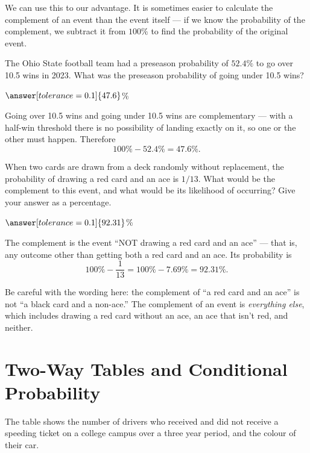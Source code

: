 \documentclass[12pt]{ximera}
\begin{document}
We can use this to our advantage. It is sometimes easier to calculate the complement of
an event than the event itself --- if we know the probability of the complement, we
subtract it from $100\%$ to find the probability of the original event.

\begin{problem}
The Ohio State football team had a preseason probability of $52.4\%$ to go over 10.5 wins
in 2023. What was the preseason probability of going under 10.5 wins?

$\answer[tolerance=0.1]{47.6}$\%

\begin{solution}
Going over 10.5 wins and going under 10.5 wins are complementary --- with a half-win
threshold there is no possibility of landing exactly on it, so one or the other must
happen. Therefore
\[
100\% - 52.4\% = 47.6\%.
\]
\end{solution}
\end{problem}

\begin{problem}
When two cards are drawn from a deck randomly without replacement, the probability of
drawing a red card and an ace is $1/13$. What would be the complement to this event, and
what would be its likelihood of occurring? Give your answer as a percentage.

$\answer[tolerance=0.1]{92.31}$\%

\begin{freeResponse}
\end{freeResponse}

\begin{solution}
The complement is the event ``NOT drawing a red card and an ace'' --- that is, any
outcome other than getting both a red card and an ace. Its probability is
\[
100\% - \frac{1}{13} = 100\% - 7.69\% = 92.31\%.
\]

Be careful with the wording here: the complement of ``a red card and an ace'' is not
``a black card and a non-ace.'' The complement of an event is \emph{everything else},
which includes drawing a red card without an ace, an ace that isn't red, and neither.
\end{solution}
\end{problem}

\section*{Two-Way Tables and Conditional Probability}

The table shows the number of drivers who received and did not receive a speeding ticket
on a college campus over a three year period, and the colour of their car.
\end{document}
